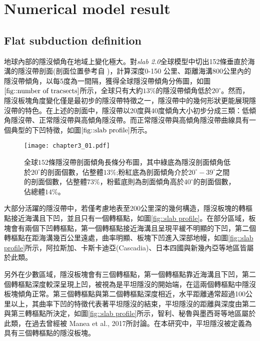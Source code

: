 
\chapter{Numerical model result}

\section{Flat subduction definition}


地球內部的隱沒傾角在地域上變化極大。對\emph{slab 2.0}全球模型中切出152條垂直於海溝的隱沒帶剖面(剖面位置參考自 \citealp{Hu2020})，計算深度0-150 公里、距離海溝800公里內的隱沒帶傾角，以每5度為一間隔，獲得全球隱沒帶傾角分佈圖，如圖$\ref{fig::number of tracsects}$所示，全球只有大約$13\%$的隱沒帶傾角低於$20^\circ$。然而，隱沒板塊角度變化僅是最初步的隱沒帶特徵之一，隱沒帶中的幾何形狀更能展現隱沒帶的特色。在上述的剖面中，隱沒帶以20度與40度傾角大小初步分成三類：低傾角隱沒帶、正常隱沒帶與高傾角隱沒帶。而正常隱沒帶與高傾角隱沒帶曲線具有一個典型的下凹特徵，如圖$\ref{fig::slab profile}$所示。

\begin{figure*}[ht!]
    \centering
    \texttt{[image: chapter3\_01.pdf]}
    \caption{全球$152$條隱沒帶剖面傾角長條分布圖，其中綠底為隱沒剖面傾角低於$20^\circ$的剖面個數，佔整體$13\%$;粉紅底為剖面傾角介於$20^\circ-39^\circ$之間的剖面個數，佔整體$73\%$，粉藍底則為剖面傾角高於$40^\circ$的剖面個數，佔總體$14\%$。}
    \label{fig::number of tracsects}
\end{figure*}



大部分活躍的隱沒帶中，若僅考慮地表至200公里深的幾何構造，隱沒板塊的轉樞點接近海溝且下凹，並且只有一個轉樞點，如圖\ref{fig::slab profile}。在部分區域，板塊會有兩個下凹轉樞點，第一個轉樞點接近海溝且呈現平緩不明顯的下凹，第二個轉樞點在距海溝幾百公里遠處，曲率明顯、板塊下凹進入深部地幔，如圖\ref{fig::slab profile}所示，阿拉斯加、卡斯卡迪亞(Cascadia)、日本四國與新幾內亞等地區皆屬於此類。


另外在少數區域，隱沒板塊會有三個轉樞點，第一個轉樞點靠近海溝且下凹，第二個轉樞點深度較深呈現上凹，被視為是平坦隱沒的開始端，在這兩個轉樞點中隱沒板塊傾角正常。第三個轉樞點與第二個轉樞點深度相近，水平距離通常超過100公里以上，其曲率下凹的特徵代表著平坦隱沒的結束，平坦隱沒的距離與深度由第二與第三轉樞點所決定，如圖\ref{fig::slab profile}所示，智利、秘魯與墨西哥等地區屬於此類，在過去曾經被 Manea et al., 2017所討論。在本研究中，平坦隱沒被定義為具有三個轉樞點的隱沒板塊。



